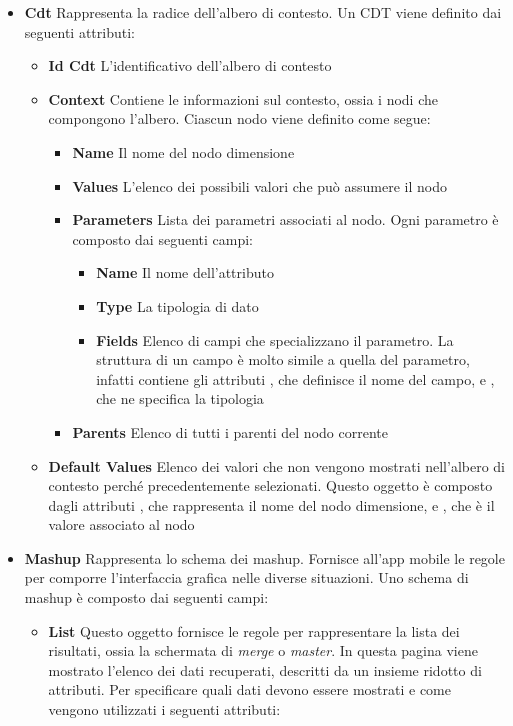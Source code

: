 \begin{itemize}
	\item \textbf{Cdt} Rappresenta la radice dell'albero di contesto. Un CDT viene definito dai seguenti attributi:
	\begin{itemize}
		\item \textbf{Id Cdt} L'identificativo dell'albero di contesto
		\item \textbf{Context} Contiene le informazioni sul contesto, ossia i nodi che compongono l'albero. Ciascun nodo viene definito come segue:
		\begin{itemize}
			\item \textbf{Name} Il nome del nodo dimensione
			\item \textbf{Values} L'elenco dei possibili valori che può assumere il nodo
			\item \textbf{Parameters} Lista dei parametri associati al nodo. Ogni parametro è composto dai seguenti campi:
			\begin{itemize}
				\item \textbf{Name} Il nome dell'attributo
				\item \textbf{Type} La tipologia di dato
				\item \textbf{Fields} Elenco di campi che specializzano il parametro. La struttura di un campo è molto simile a quella del parametro, infatti contiene gli attributi , che definisce il nome del campo, e , che ne specifica la tipologia
			\end{itemize}
			\item \textbf{Parents} Elenco di tutti i parenti del nodo corrente
		\end{itemize}
		\item \textbf{Default Values} Elenco dei valori che non vengono mostrati nell'albero di contesto perché precedentemente selezionati. Questo oggetto è composto dagli attributi , che rappresenta il nome del nodo dimensione, e , che è il valore associato al nodo
	\end{itemize}
	\item \textbf{Mashup} Rappresenta lo schema dei mashup. Fornisce all'app mobile le regole per comporre l'interfaccia grafica nelle diverse situazioni. Uno schema di mashup è composto dai seguenti campi:
	\begin{itemize}
		\item \textbf{List} Questo oggetto fornisce le regole per rappresentare la lista dei risultati, ossia la schermata di \emph{merge} o \emph{master}. In questa pagina viene mostrato l'elenco dei dati recuperati, descritti da un insieme ridotto di attributi. Per specificare quali dati devono essere mostrati e come vengono utilizzati i seguenti attributi:

\end{itemize}
\end{itemize}
